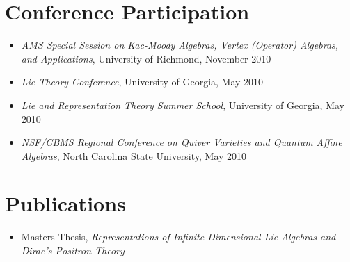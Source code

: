 \documentclass[11pt]{article}
\begin{document}

\section*{Conference Participation}

\begin{itemize}
\setlength{\itemsep}{1pt}
\item	{\it AMS Special Session on Kac-Moody Algebras, Vertex (Operator)
Algebras, and Applications}, University of Richmond, November 2010
\item	{\it Lie Theory Conference}, University of Georgia, May 2010
\item	{\it Lie and Representation Theory Summer School}, University of Georgia,
May 2010
\item	{\it NSF/CBMS Regional Conference on Quiver Varieties and Quantum Affine
Algebras}, North Carolina State University, May 2010
\end{itemize}


\section*{Publications}

\begin{itemize}

\item Masters Thesis, {\it Representations of Infinite Dimensional Lie Algebras
and Dirac's Positron Theory}

\end{itemize}
\end{document}
